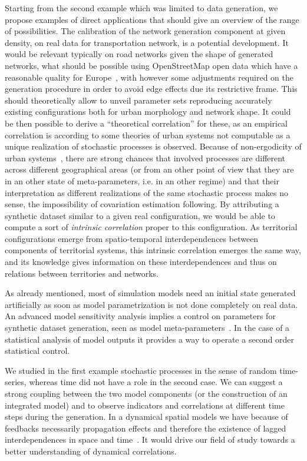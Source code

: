 \documentclass{bmcart}
\begin{document}
Starting from the second example which was limited to data generation, we propose examples of direct applications that should give an overview of the range of possibilities. The calibration of the network generation component at given density, on real data for transportation network, is a potential development. It would be relevant typically on road networks given the shape of generated networks, what should be possible using OpenStreetMap open data which have a reasonable quality for Europe~\cite{girres2010quality}, with however some adjustments required on the generation procedure in order to avoid edge effects due its restrictive frame. This should theoretically allow to unveil parameter sets reproducing accurately existing configurations both for urban morphology and network shape. It could be then possible to derive a ``theoretical correlation'' for these, as an empirical correlation is according to some theories of urban systems not computable as a unique realization of stochastic processes is observed. Because of non-ergodicity of urban systems~\cite{pumain2012urban}, there are strong chances that involved processes are different across different geographical areas (or from an other point of view that they are in an other state of meta-parameters, i.e. in an other regime) and that their interpretation as different realizations of the same stochastic process makes no sense, the impossibility of covariation estimation following. By attributing a synthetic dataset similar to a given real configuration, we would be able to compute a sort of \emph{intrinsic correlation} proper to this configuration. As territorial configurations emerge from spatio-temporal interdependences between components of territorial systems, this intrinsic correlation emerges the same way, and its knowledge gives information on these interdependences and thus on relations between territories and networks.

As already mentioned, most of simulation models need an initial state generated artificially as soon as model parametrization is not done completely on real data. An advanced model sensitivity analysis implies a control on parameters for synthetic dataset generation, seen as model meta-parameters~\cite{raimbault2018space}. In the case of a statistical analysis of model outputs it provides a way to operate a second order statistical control.

We studied in the first example stochastic processes in the sense of random time-series, whereas time did not have a role in the second case. We can suggest a strong coupling between the two model components (or the construction of an integrated model) and to observe indicators and correlations at different time steps during the generation. In a dynamical spatial models we have because of feedbacks necessarily propagation effects and therefore the existence of lagged interdependences in space and time~\cite{pigozzi1980interurban}. It would drive our field of study towards a better understanding of dynamical correlations.
\end{document}
